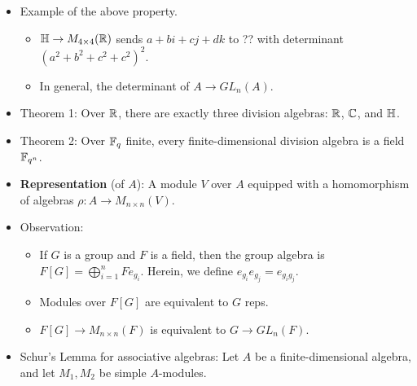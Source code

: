 \documentclass[../notes.tex]{subfiles}
\begin{document}
\begin{itemize}
\begin{enumerate}
\begin{proof}
            Then $\C\to M_{2\times 2}(\R)$ sends
            \begin{equation*}
                a+bi\mapsto L_{a+bi} =
                \begin{bmatrix}
                    \alpha & -\beta\\
                    \beta & \alpha\\
                \end{bmatrix}
            \end{equation*}
            Then $L_aL_b=L_{ab}$ and $L_a+L_b=L_{a^{-1}b}$, so $L_a$ has eigenvalue $\lambda$, so $L_ax=ax=\lambda x$, so $a=\lambda\cdot 1$.

            What is going on here and how does this work??
        \end{proof}
    \end{enumerate}
    \item Example of the above property.
    \begin{itemize}
        \item $\mathbb{H}\to M_{4\times 4}(\mathbb{R})$ sends $a+bi+cj+dk$ to ?? with determinant $(a^2+b^2+c^2+c^2)^2$.
        \item In general, the determinant of $A\to GL_n(A)$.
    \end{itemize}
    \item Theorem 1: Over $\mathbb{R}$, there are exactly three division algebras: $\mathbb{R}$, $\mathbb{C}$, and $\mathbb{H}$.
    \item Theorem 2: Over $\mathbb{F}_q$ finite, every finite-dimensional division algebra is a field $\mathbb{F}_{q^n}$.
    \item \textbf{Representation} (of $A$): A module $V$ over $A$ equipped with a homomorphism of algebras $\rho:A\to M_{n\times n}(V)$.
    \item Observation:
    \begin{itemize}
        \item If $G$ is a group and $F$ is a field, then the group algebra is $F[G]=\bigoplus_{i=1}^nFe_{g_i}$. Herein, we define $e_{g_i}e_{g_j}=e_{g_ig_j}$.
        \item Modules over $F[G]$ are equivalent to $G$ reps.
        \item $F[G]\to M_{n\times n}(F)$ is equivalent to $G\to GL_n(F)$.
    \end{itemize}
    \item Schur's Lemma for associative algebras: Let $A$ be a finite-dimensional algebra, and let $M_1,M_2$ be simple $A$-modules.
    \begin{enumerate}

\end{enumerate}
\end{itemize}
\end{document}
